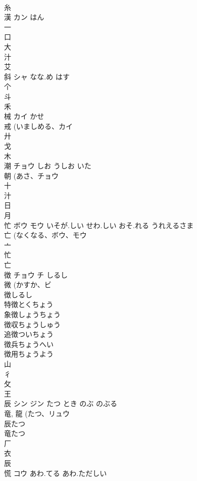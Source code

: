 \documentclass[8pt]{extreport}
\begin{document}
\begin{CJK}{UTF8}{min}
\\	糸 
\\	漢	カン	はん	
\\	一 
\\	口 
\\	大 
\\	汁 
\\	艾 
\\	斜	シャ	なな.め はす	
\\	个 
\\	斗 
\\	禾 
\\	械	カイ	かせ	
\\	戒 (いましめる、カイ 
\\	廾 
\\	戈 
\\	木 
\\	潮	チョウ	しお うしお いた	
\\	朝 (あさ、チョウ 
\\	十 
\\	汁 
\\	日 
\\	月 
\\	忙	ボウ モウ	いそが.しい せわ.しい おそ.れる うれえるさま	
\\	亡 (なくなる、ボウ、モウ 
\\	亠 
\\	忙 
\\	亡 
\\	徴	チョウ チ	しるし	
\\	微 (かすか、ビ 
\\	徴しるし 
\\	特徴とくちょう 
\\	象徴しょうちょう 
\\	徴収ちょうしゅう 
\\	追徴ついちょう 
\\	徴兵ちょうへい 
\\	徴用ちょうよう 
\\	山 
\\	彳 
\\	攵 
\\	王 
\\	辰	シン ジン	たつ とき のぶ のぶる	
\\	竜, 龍 (たつ、リュウ 
\\	辰たつ 
\\	竜たつ 
\\	厂 
\\	衣 
\\	辰 
\\	慌	コウ	あわ.てる あわ.ただしい	

\end{CJK}
\end{document}
